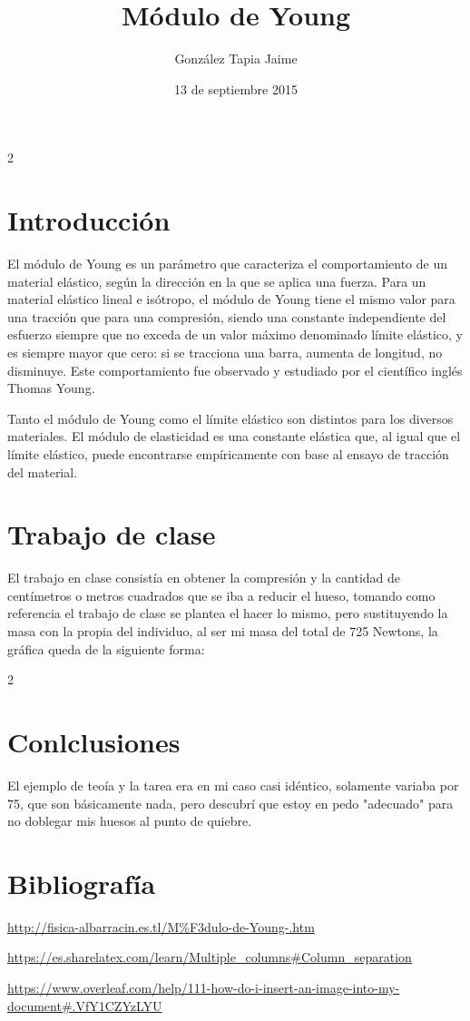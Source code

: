\documentclass[11pt,a4paper]{article}
\begin{document}
\begin{multicols}{2}
\author{Gonz\'alez Tapia Jaime}
\title{M\'odulo de Young}
\date {13 de septiembre 2015}
\maketitle

\section{Introducci\'on}
El m\'odulo de Young  es un par\'ametro que caracteriza el comportamiento de un material el\'astico, seg\'un la direcci\'on en la que se aplica una fuerza. Para un material el\'astico lineal e is\'otropo, el m\'odulo de Young tiene el mismo valor para una tracci\'on que para una compresi\'on, siendo una constante  independiente del esfuerzo siempre que no exceda de un valor m\'aximo denominado l\'imite el\'astico, y es siempre mayor que cero: si se tracciona una barra, aumenta de longitud, no disminuye. Este comportamiento fue observado y estudiado por el científico ingl\'es Thomas Young.


Tanto el m\'odulo de Young como el l\'imite el\'astico son distintos para los diversos materiales. El m\'odulo de elasticidad es una constante el\'astica que, al igual que el l\'imite el\'astico, puede encontrarse emp\'iricamente con base al ensayo de tracci\'on del material.


\section{Trabajo de clase}
El trabajo en clase consist\'ia en obtener la compresi\'on y la cantidad de cent\'imetros o metros cuadrados que se iba a reducir el hueso, tomando como referencia el trabajo de clase se plantea el hacer lo mismo, pero sustituyendo la masa con la propia del individuo, al ser mi masa del total de 725 Newtons, la gr\'afica queda de la siguiente forma:
\end{multicols}

\begin{multicols} {2}


\section{Conlclusiones}
El ejemplo de teo\'ia y la tarea era en mi caso casi id\'entico, solamente variaba por 75, que son b\'asicamente nada, pero descubr\'i que estoy en pedo "adecuado" para no doblegar mis huesos al punto de quiebre.
\end{multicols}
 
\section{Bibliograf\'ia}
\url{http://fisica-albarracin.es.tl/M%F3dulo-de-Young-.htm}

\url{https://es.sharelatex.com/learn/Multiple_columns#Column_separation}

\url{https://www.overleaf.com/help/111-how-do-i-insert-an-image-into-my-document#.VfY1CZYzLYU}
\end{document}
